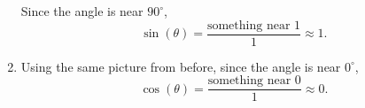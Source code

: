 \documentclass[noauthor,nooutcomes,12pt]{ximera}
\begin{document}
\begin{question}
\begin{freeResponse}
\begin{enumerate}
\begin{center}
      \end{center}
      Since the angle is near $90^\circ$,
      \[
      \sin(\theta) = \frac{\text{something near $1$}}{1} \approx 1.
      \]
     \item Using the same picture from before, since the angle is near $0^\circ$,
      \[
      \cos(\theta) = \frac{\text{something near $0$}}{1} \approx 0.
      \] 
    \end{enumerate}
  \end{freeResponse}
\end{question}
\end{document}
